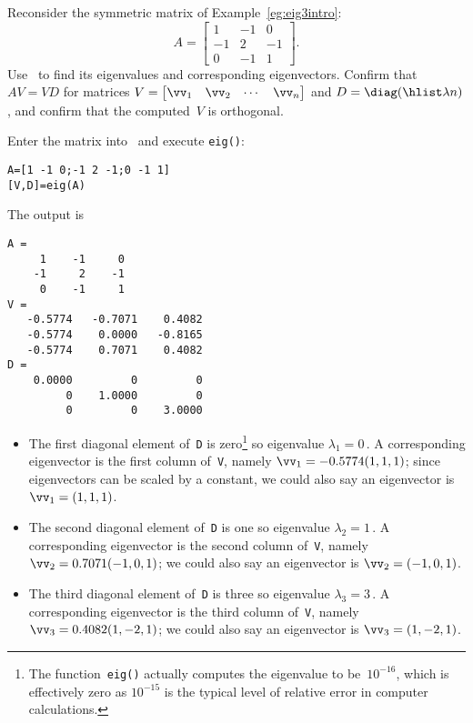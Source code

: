 \begin{example} \label{eg:eig3eig}
Reconsider the symmetric matrix of Example~\ref{eg:eig3intro}:
\begin{equation*}
A=\begin{bmatrix} 1&-1&0\\-1&2&-1\\0&-1&1 \end{bmatrix}.
\end{equation*}
Use \script\ to find its eigenvalues and corresponding eigenvectors.
Confirm that \(AV=VD\) for matrices \(V=\begin{bmatrix} \vv_1&\vv_2&\cdots&\vv_n \end{bmatrix}\) and \(D=\diag(\hlist\lambda n)\), and confirm that the computed~\(V\) is orthogonal.
\begin{solution} 
Enter the matrix into \script\ and execute \verb|eig()|:
\setbox\ajrqrbox\hbox{}%
\marginpar{\usebox{\ajrqrbox}}%
\begin{verbatim}
A=[1 -1 0;-1 2 -1;0 -1 1]
[V,D]=eig(A)
\end{verbatim}
The output is
\begin{verbatim}
A =
     1    -1     0
    -1     2    -1
     0    -1     1
V =
   -0.5774   -0.7071    0.4082
   -0.5774    0.0000   -0.8165
   -0.5774    0.7071    0.4082
D =
    0.0000         0         0
         0    1.0000         0
         0         0    3.0000
\end{verbatim}
\begin{itemize}
\item The first diagonal element of~\verb|D| is zero\footnote{The function~\texttt{eig()} actually computes the eigenvalue to be~\(10^{-16}\), which is effectively zero as \(10^{-15}\) is the typical level of relative error in computer calculations.} so eigenvalue \(\lambda_1=0\)\,.
A corresponding eigenvector is the first column of~\verb|V|, namely \(\vv_1=-0.5774(1,1,1)\);  since eigenvectors can be scaled by a constant, we could also say an eigenvector is \(\vv_1=(1,1,1)\).
\item The second diagonal element of~\verb|D| is one so eigenvalue \(\lambda_2=1\)\,.
A corresponding eigenvector is the second column of~\verb|V|, namely \(\vv_2=0.7071(-1,0,1)\);  we could also say an eigenvector is \(\vv_2=(-1,0,1)\).
\item The third diagonal element of~\verb|D| is three so eigenvalue \(\lambda_3=3\)\,.
A corresponding eigenvector is the third column of~\verb|V|, namely \(\vv_3=0.4082(1,-2,1)\);  we could also say an eigenvector is \(\vv_3=(1,-2,1)\).

\end{itemize}
\end{solution}
\end{example}
